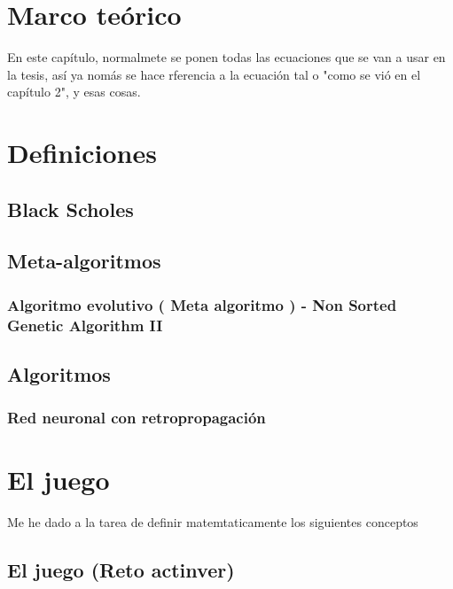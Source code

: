 

\chapter{Marco teórico}

En este capítulo, normalmete se ponen todas las ecuaciones que se van a usar en la tesis, así ya nomás se hace rferencia a la ecuación tal o "como se vió en el capítulo 2", y esas cosas. 

\chapter{ Definiciones }

    \section{ Black Scholes }

    \section{ Meta-algoritmos }
    
        \subsection{  Algoritmo evolutivo ( Meta algoritmo ) - Non Sorted Genetic Algorithm II }
    
    \section{ Algoritmos }
    
        \subsection{ Red neuronal con retropropagación }
    

\chapter{ El juego }

    Me he dado a la tarea de definir matemtaticamente los siguientes conceptos
    
    \section{ El juego (Reto actinver) }
        
